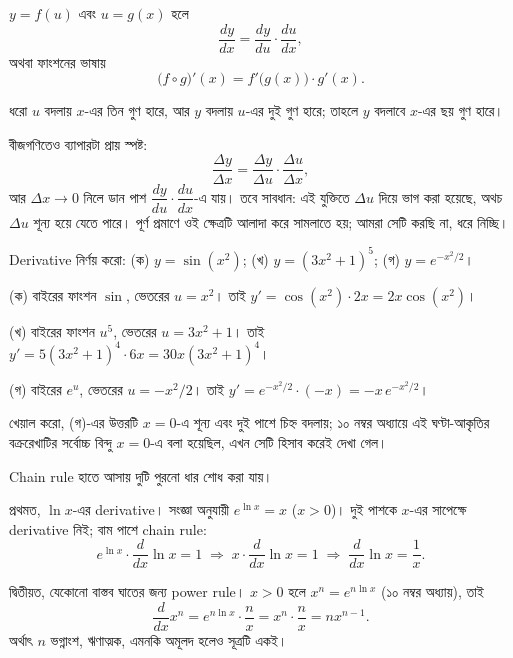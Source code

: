 \documentclass[11pt]{article}
\begin{document}
\begin{idea}
$y = f(u)$ এবং $u = g(x)$ হলে
\[
  \frac{dy}{dx} = \frac{dy}{du} \cdot \frac{du}{dx} ,
\]
অথবা ফাংশনের ভাষায়
\[
  \bigl( f \circ g \bigr)'(x) = f'\bigl( g(x) \bigr) \cdot g'(x) .
\]
\end{idea}

ধরো $u$ বদলায় $x$-এর তিন গুণ হারে, আর $y$ বদলায় $u$-এর
দুই গুণ হারে; তাহলে $y$ বদলাবে $x$-এর ছয় গুণ হারে। 

বীজগণিতেও ব্যাপারটা প্রায় স্পষ্ট:
\[
  \frac{\Delta y}{\Delta x} = \frac{\Delta y}{\Delta u} \cdot
  \frac{\Delta u}{\Delta x} ,
\]
আর $\Delta x \to 0$ নিলে ডান পাশ $\dfrac{dy}{du}\cdot\dfrac{du}{dx}$-এ যায়।
তবে সাবধান: এই যুক্তিতে $\Delta u$ দিয়ে ভাগ করা হয়েছে, অথচ $\Delta u$ শূন্য
হয়ে যেতে পারে। পূর্ণ প্রমাণে ওই ক্ষেত্রটি আলাদা করে সামলাতে হয়; আমরা সেটি
করছি না, ধরে নিচ্ছি।

\begin{example}
Derivative নির্ণয় করো: (ক) $y = \sin\left( x^{2} \right)$;
(খ) $y = \left( 3x^{2}+1 \right)^{5}$; (গ) $y = e^{-x^{2}/2}$।
\end{example}

\begin{solbox}
(ক) বাইরের ফাংশন $\sin$, ভেতরের $u = x^{2}$। তাই
$y' = \cos\left( x^{2} \right) \cdot 2x = 2x\cos\left( x^{2} \right)$।

(খ) বাইরের ফাংশন $u^{5}$, ভেতরের $u = 3x^{2}+1$। তাই
$y' = 5\left( 3x^{2}+1 \right)^{4} \cdot 6x = 30x\left( 3x^{2}+1 \right)^{4}$।

(গ) বাইরের $e^{u}$, ভেতরের $u = -x^{2}/2$। তাই
$y' = e^{-x^{2}/2} \cdot (-x) = -x\,e^{-x^{2}/2}$।

খেয়াল করো, (গ)-এর উত্তরটি $x = 0$-এ শূন্য এবং দুই পাশে চিহ্ন বদলায়; ১০ নম্বর
অধ্যায়ে এই ঘণ্টা-আকৃতির বক্ররেখাটির সর্বোচ্চ বিন্দু $x=0$-এ বলা হয়েছিল,
এখন সেটি হিসাব করেই দেখা গেল।
\end{solbox}

Chain rule হাতে আসায় দুটি পুরনো ধার শোধ করা যায়।

প্রথমত, $\ln x$-এর derivative। সংজ্ঞা অনুযায়ী $e^{\ln x} = x$ ($x>0$)।
দুই পাশকে $x$-এর সাপেক্ষে derivative নিই; বাম পাশে chain rule:
\[
  e^{\ln x} \cdot \frac{d}{dx}\ln x = 1
  \;\Longrightarrow\; x \cdot \frac{d}{dx}\ln x = 1
  \;\Longrightarrow\; \frac{d}{dx}\ln x = \frac{1}{x} .
\]

দ্বিতীয়ত, যেকোনো বাস্তব ঘাতের জন্য power rule। $x > 0$ হলে
$x^{n} = e^{n\ln x}$ (১০ নম্বর অধ্যায়), তাই
\[
  \frac{d}{dx}x^{n} = e^{n\ln x} \cdot \frac{n}{x}
  = x^{n} \cdot \frac{n}{x} = n x^{n-1} .
\]
অর্থাৎ $n$ ভগ্নাংশ, ঋণাত্মক, এমনকি অমূলদ হলেও সূত্রটি একই।
\end{document}
